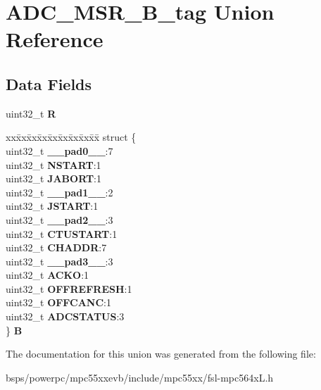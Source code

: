 \hypertarget{unionADC__MSR__32B__tag}{}\section{A\+D\+C\+\_\+\+M\+S\+R\+\_\+B\+\_\+tag Union Reference}
\label{unionADC__MSR__32B__tag}
\subsection*{Data Fields}
\begin{DoxyCompactItemize}
\item 
\mbox{\label{unionADC__MSR__32B__tag_ad5517ac4825cf8f89d3d5cd21c67e0a9}} 
uint32\+\_\+t {\bfseries R}
\item 
\mbox{\label{unionADC__MSR__32B__tag_a38d56ce0c6f560cb57b16ca90bc7627e}} 
\begin{tabbing}
xx\=xx\=xx\=xx\=xx\=xx\=xx\=xx\=xx\=\kill
struct \{\\
\>uint32\_t {\bfseries \_\_pad0\_\_}:7\\
\>uint32\_t {\bfseries NSTART}:1\\
\>uint32\_t {\bfseries JABORT}:1\\
\>uint32\_t {\bfseries \_\_pad1\_\_}:2\\
\>uint32\_t {\bfseries JSTART}:1\\
\>uint32\_t {\bfseries \_\_pad2\_\_}:3\\
\>uint32\_t {\bfseries CTUSTART}:1\\
\>uint32\_t {\bfseries CHADDR}:7\\
\>uint32\_t {\bfseries \_\_pad3\_\_}:3\\
\>uint32\_t {\bfseries ACKO}:1\\
\>uint32\_t {\bfseries OFFREFRESH}:1\\
\>uint32\_t {\bfseries OFFCANC}:1\\
\>uint32\_t {\bfseries ADCSTATUS}:3\\
\} {\bfseries B}\\

\end{tabbing}\end{DoxyCompactItemize}


The documentation for this union was generated from the following file\+:\begin{DoxyCompactItemize}
\item 
bsps/powerpc/mpc55xxevb/include/mpc55xx/fsl-\/mpc564x\+L.\+h\end{DoxyCompactItemize}
